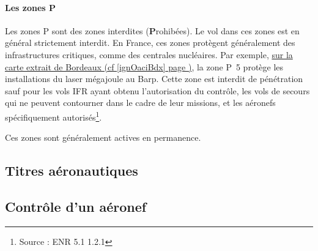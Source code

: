 			\paragraph{Les zones P}
			Les zones P sont des zones interdites (\textbf{P}rohibées). Le vol dans ces zones est en général strictement interdit. En France, ces zones protègent généralement des infrastructures critiques, comme des centrales nucléaires. Par exemple, \hyperlink{ignOaciBordeaux.1}{sur la carte extrait de Bordeaux (cf \ref{ignOaciBdx} page \pageref{ignOaciBdx})}, la zone P~5 protège les installations du laser mégajoule au Barp. Cette zone est interdit de pénétration sauf pour les vols IFR ayant obtenu l'autorisation du contrôle, les vols de secours qui ne peuvent contourner dans le cadre de leur missions, et les aéronefs spécifiquement autorisés\footnote{Source : ENR 5.1 1.2.1}.
			
			Ces zones sont généralement actives en permanence.
	
	\subsection{Titres aéronautiques}
	
	\subsection{Contrôle d'un aéronef}